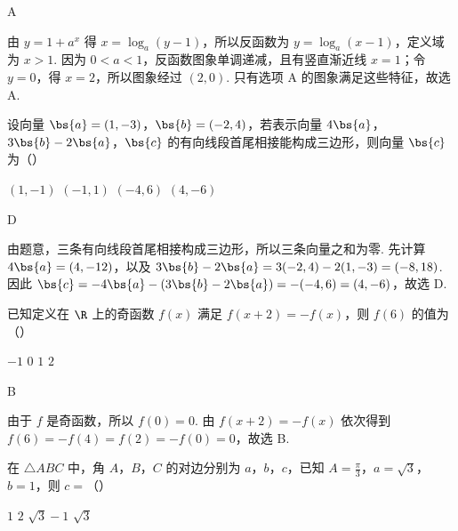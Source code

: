 \begin{answer}
A
\end{answer}

\begin{solution}
由 \(y=1+a^x\) 得 \(x=\log_a(y-1)\)，所以反函数为 \(y=\log_a(x-1)\)，定义域为 \(x>1\). 因为 \(0<a<1\)，反函数图象单调递减，且有竖直渐近线 \(x=1\)；令 \(y=0\)，得 \(x=2\)，所以图象经过 \((2,0)\). 只有选项 A 的图象满足这些特征，故选 A.
\end{solution}

\begin{problem}
设向量 \(\bs{a} = (1, -3)\)，\(\bs{b} = (-2, 4)\)，若表示向量 \(4\bs{a}\)，\(3\bs{b} - 2\bs{a}\)，\(\bs{c}\) 的有向线段首尾相接能构成三边形，则向量 \(\bs{c}\) 为（\quad）

\choices
    {\((1, - 1)\)}
    {\((-1, 1)\)}
    {\((-4, 6)\)}
    {\((4, - 6)\)}
\end{problem}

\begin{answer}
D
\end{answer}

\begin{solution}
由题意，三条有向线段首尾相接构成三边形，所以三条向量之和为零. 先计算 \(4\bs{a}=(4,-12)\)，以及 \(3\bs{b}-2\bs{a}=3(-2,4)-2(1,-3)=(-8,18)\). 因此 \(\bs{c}=-4\bs{a}-(3\bs{b}-2\bs{a})=-(-4,6)=(4,-6)\)，故选 D.
\end{solution}

\begin{problem}
已知定义在 \(\R\) 上的奇函数 \(f(x)\) 满足 \(f(x + 2) = -f(x)\)，则 \(f(6)\) 的值为（\quad）

\choices
    {\(-1\)}
    {\(0\)}
    {\(1\)}
    {\(2\)}
\end{problem}

\begin{answer}
B
\end{answer}

\begin{solution}
由于 \(f\) 是奇函数，所以 \(f(0)=0\). 由 \(f(x+2)=-f(x)\) 依次得到 \(f(6)=-f(4)=f(2)=-f(0)=0\)，故选 B.
\end{solution}

\begin{problem}
在 \(\triangle ABC\) 中，角 \(A\)，\(B\)，\(C\) 的对边分别为 \(a\)，\(b\)，\(c\)，已知 \(A = \frac{\pi}{3}\)，\(a = \sqrt{3}\)，\(b = 1\)，则 \(c =\)（\quad）

\choices
    {\(1\)}
    {\(2\)}
    {\(\sqrt{3} - 1\)}
    {\(\sqrt{3}\)}
\end{problem}


